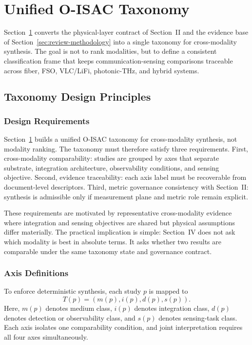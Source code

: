 \section{Unified O-ISAC Taxonomy}
\label{sec:taxonomy}

Section~\ref{sec:taxonomy} converts the physical-layer contract of Section~II and the evidence base of Section~\ref{sec:review-methodology} into a single taxonomy for cross-modality synthesis. The goal is not to rank modalities, but to define a consistent classification frame that keeps communication-sensing comparisons traceable across fiber, FSO, VLC/LiFi, photonic-THz, and hybrid systems.

\subsection{Taxonomy Design Principles}
\subsubsection{Design Requirements}
Section~\ref{sec:taxonomy} builds a unified O-ISAC taxonomy for cross-modality synthesis, not modality ranking. The taxonomy must therefore satisfy three requirements. First, cross-modality comparability: studies are grouped by axes that separate substrate, integration architecture, observability conditions, and sensing objective. Second, evidence traceability: each axis label must be recoverable from document-level descriptors. Third, metric governance consistency with Section~II: synthesis is admissible only if measurement plane and metric role remain explicit.

These requirements are motivated by representative cross-modality evidence where integration and sensing objectives are shared but physical assumptions differ materially. The practical implication is simple: Section~IV does not ask which modality is best in absolute terms. It asks whether two results are comparable under the same taxonomy state and governance contract.

\subsubsection{Axis Definitions}
To enforce deterministic synthesis, each study $p$ is mapped to
\[
T(p) = (m(p), i(p), d(p), s(p)).
\]
Here, $m(p)$ denotes medium class, $i(p)$ denotes integration class, $d(p)$ denotes detection or observability class, and $s(p)$ denotes sensing-task class. Each axis isolates one comparability condition, and joint interpretation requires all four axes simultaneously.

